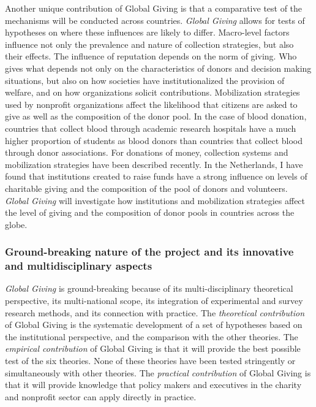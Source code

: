 \documentclass[twocolumn, serif, rga, numeric]{jote-article}
\begin{document}
Another unique contribution of Global Giving is that a comparative test of the mechanisms will be conducted across countries. \emph{Global Giving} allows for tests of hypotheses on where these influences are likely to differ. Macro-level factors influence not only the prevalence and nature of collection strategies, but also their effects. The influence of reputation depends on the norm of giving.\cite{MortonNewYorkUniversity} Who gives what depends not only on the characteristics of donors and decision making situations, but also on how societies have institutionalized the provision of welfare, and on how organizations solicit contributions.\cite{Healy2000, Healy2004}
Mobilization strategies used by nonprofit organizations affect the likelihood that citizens are asked to give as well as the composition of the donor pool.\cite{Bryant2003} In the case of blood donation, countries that collect blood through academic research hospitals have a much higher proportion of students as blood donors than countries that collect blood through donor associations.\cite{Healy2000} For donations of money, collection systems and mobilization strategies have been described recently.\cite{Breeze2015} In the Netherlands, I have found that institutions created to raise funds have a strong influence on levels of charitable giving and the composition of the pool of donors and volunteers.\cite{Bekkers2011a, Bekkers2011} \emph{Global Giving} will investigate how institutions and mobilization strategies affect the level of giving and the composition of donor pools in countries across the globe.

 {}\subsubsection*{Ground-breaking nature of the project and its innovative and multidisciplinary aspects} 

\emph{Global Giving} is ground-breaking because of its multi-disciplinary theoretical perspective, its multi-national scope, its integration of experimental and survey research methods, and its connection with practice. The \emph{theoretical contribution} of Global Giving is the systematic development of a set of hypotheses based on the institutional perspective, and the comparison with the other theories.
The \emph{empirical contribution} of Global Giving is that it will provide the best possible test of the six theories. None of these theories have been tested stringently or simultaneously with other theories. The \emph{practical contribution} of Global Giving is that it will provide knowledge that policy makers and executives in the charity and nonprofit sector can apply directly in practice.
\end{document}

